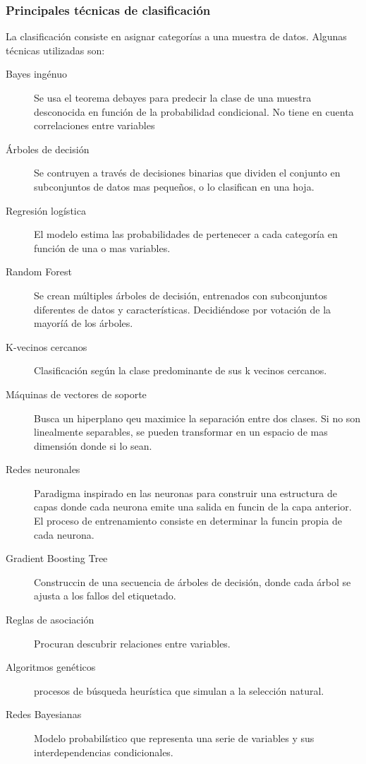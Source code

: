     \subsubsection{Principales técnicas de clasificación}
        La clasificación consiste en asignar categorías a una muestra de datos. Algunas técnicas utilizadas son:
        \begin{description}
            \item[Bayes ingénuo] Se usa el teorema debayes para predecir la clase de una muestra desconocida en función de la probabilidad condicional. No tiene en cuenta correlaciones entre variables
            \item[Árboles de decisión] Se contruyen a través de decisiones binarias que dividen el conjunto en subconjuntos de datos mas pequeños, o lo clasifican en una hoja.
            \item[Regresión logística] El modelo estima las probabilidades de pertenecer a cada categoría en función de una o mas variables.
            \item[Random Forest] Se crean múltiples árboles de decisión, entrenados con subconjuntos diferentes de datos y características. Decidiéndose por votación de la mayoríá de los árboles.
            \item[K-vecinos cercanos] Clasificación según la clase predominante de sus k vecinos cercanos.
            \item[Máquinas de vectores de soporte] Busca un hiperplano qeu maximice la separación entre dos clases. Si no son linealmente separables, se pueden transformar en un espacio de mas dimensión donde si lo sean. 
            \item[Redes neuronales] Paradigma inspirado en las neuronas para construir una estructura de capas donde cada neurona emite una salida en funcin de la capa anterior. El proceso de entrenamiento consiste en determinar la funcin propia de cada neurona.
            \item[Gradient Boosting Tree] Construccin de una secuencia de árboles de decisión, donde cada árbol se ajusta a los fallos del etiquetado.
            \item[Reglas de asociación] Procuran descubrir relaciones entre variables.
            \item[Algoritmos genéticos] procesos de búsqueda heurística que simulan a la selección natural. 
            \item[Redes Bayesianas] Modelo probabilístico que representa una serie de variables y sus interdependencias condicionales.
        \end{description}
